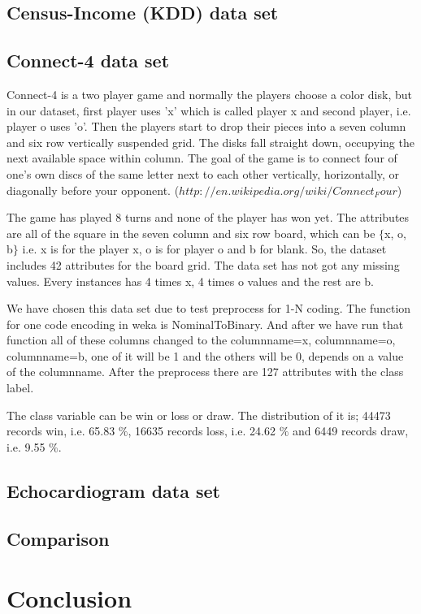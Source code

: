 \documentclass[a4paper]{article}
\begin{document}
\subsection{Census-Income (KDD) data set}

\subsection{Connect-4 data set}

Connect-4 is a two player game and normally the players choose a color disk, but in our dataset, first player uses 'x' which is called player x and second player, i.e. player o uses 'o'. Then the players start to drop their pieces into a seven column and six row vertically suspended grid. The disks fall straight down, occupying the next available space within column. The goal of the game is to connect four of one's own discs of the same letter next to each other vertically, horizontally, or diagonally before your opponent. ($http://en.wikipedia.org/wiki/Connect_Four$) 

The game has played 8 turns and none of the player has won yet. The attributes are all of the square in the seven column and six row board, which can be $\{$x, o, b$\}$ i.e. x is for the player x, o is for player o and b for blank. So, the dataset includes 42 attributes for the board grid. The data set has not got any missing values. Every instances has 4 times x, 4 times o values and the rest are b. 

We have chosen this data set due to test preprocess for 1-N coding. The function for one code encoding in weka is NominalToBinary. And after we have run that function all of these columns changed to the columnname=x, columnname=o, columnname=b, one of it will be 1 and the others will be 0, depends on a value of the columnname. After the preprocess there are 127 attributes with the class label. 

The class variable can be win or loss or draw. The distribution of it is; 44473 records win, i.e. 65.83 $\%$, 16635 records loss,  i.e. 24.62 $\%$ and 6449 records draw,  i.e. 9.55 $\%$.


\subsection{Echocardiogram data set}

\subsection{Comparison}

\section{Conclusion}
\end{document}
